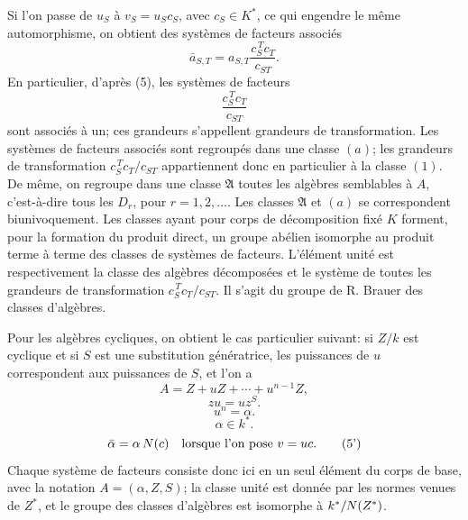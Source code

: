 Si l'on passe de \(u_S\) à \(v_S=u_Sc_S\), avec \(c_S\in K^*\), ce qui engendre le même automorphisme, on obtient des systèmes de facteurs associés
\[
        \bar a_{S,T}
        =a_{S,T}\frac{c_S^{\,T}c_T}{c_{ST}} .                 \tag{5}
\]
En particulier, d'après (5), les systèmes de facteurs
\[
        \frac{c_S^{\,T}c_T}{c_{ST}}
\]
sont associés à un; ces grandeurs s'appellent grandeurs de transformation. Les systèmes de facteurs associés sont regroupés dans une classe \((a)\); les grandeurs de transformation \(c_S^{\,T}c_T/c_{ST}\) appartiennent donc en particulier à la classe \((1)\). De même, on regroupe dans une classe \(\mathfrak A\) toutes les algèbres semblables à \(A\), c'est-à-dire tous les \(D_r\), pour \(r=1,2,\ldots\). Les classes \(\mathfrak A\) et \((a)\) se correspondent biunivoquement. Les classes ayant pour corps de décomposition fixé \(K\) forment, pour la formation du produit direct, un groupe abélien isomorphe au produit terme à terme des classes de systèmes de facteurs. L'élément unité est respectivement la classe des algèbres décomposées et le système de toutes les grandeurs de transformation \(c_S^{\,T}c_T/c_{ST}\). Il s'agit du groupe de R. Brauer des classes d'algèbres.

Pour les algèbres cycliques, on obtient le cas particulier suivant: si \(Z/k\) est cyclique et si \(S\) est une substitution génératrice, les puissances de \(u\) correspondent aux puissances de \(S\), et l'on a
\[
        A=Z+uZ+\cdots+u^{n-1}Z,                              \tag{1'}
\]
\[
        zu=uz^S.                                               \tag{2'}
\]
\[
        u^n=\alpha.                                            \tag{3'}
\]
\[
        \alpha\in k^*.                                       \tag{4'}
\]
\[
        \bar\alpha=\alpha\,N(c)
        \quad\text{lorsque l'on pose }v=uc.                  \tag{5'}
\]
Chaque système de facteurs consiste donc ici en un seul élément du corps de base, avec la notation \(A=(\alpha,Z,S)\); la classe unité est donnée par les normes venues de \(Z^*\), et le groupe des classes d'algèbres est isomorphe à \(k^*/N(Z^*)\).

